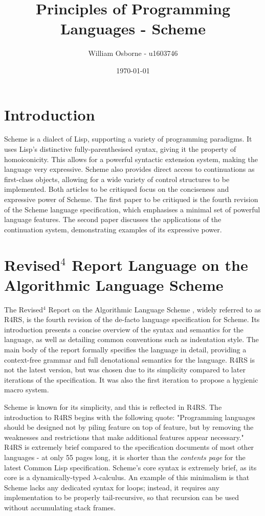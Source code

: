 \documentclass[11pt]{article}
\author{William Osborne - u1603746}
\date{\today}
\title{Principles of Programming Languages - Scheme}
\begin{document}
\maketitle
\sloppy

\section{Introduction}
\label{sec:orgfd85d45}
Scheme is a dialect of Lisp, supporting a variety of programming paradigms. It uses Lisp's distinctive fully-parenthesised syntax, giving it the property of homoiconicity. This allows for a powerful syntactic extension system, making the language very expressive. Scheme also provides direct access to continuations as first-class objects, allowing for a wide variety of control structures to be implemented. Both articles to be critiqued focus on the conciseness and expressive power of Scheme. The first paper to be critiqued is the fourth revision of the Scheme language specification, which emphasises a minimal set of powerful language features. The second paper discusses the applications of the continuation system, demonstrating examples of its expressive power.

\section{Revised\(^{\text{4}}\) Report Language on the Algorithmic Language Scheme}
\label{sec:org61844a2}
The Revised\(^{\text{4}}\) Report on the Algorithmic Language Scheme \cite{abelson1991revised}, widely referred to as R4RS, is the fourth revision of the de-facto language specification for Scheme. Its introduction presents a concise overview of the syntax and semantics for the language, as well as detailing common conventions such as indentation style. The main body of the report formally specifies the language in detail, providing a context-free grammar and full denotational semantics for the language. R4RS is not the latest version, but was chosen due to its simplicity compared to later iterations of the specification. It was also the first iteration to propose a hygienic macro system.

Scheme is known for its simplicity, and this is reflected in R4RS. The introduction to R4RS begins with the following quote: "Programming languages should be designed not by piling feature on top of feature, but by removing the weaknesses and restrictions that make additional features appear necessary." R4RS is extremely brief compared to the specification documents of most other languages - at only 55 pages long, it is shorter than the \emph{contents page} for the latest Common Lisp specification. Scheme's core syntax is extremely brief, as its core is a dynamically-typed \(\lambda\)-calculus. An example of this minimalism is that Scheme lacks any dedicated syntax for loops; instead, it requires any implementation to be properly tail-recursive, so that recursion can be used without accumulating stack frames. 
\end{document}
